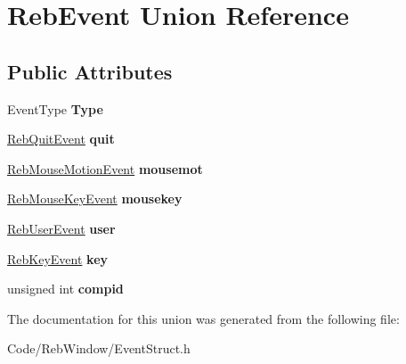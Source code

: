 \hypertarget{union_reb_event}{}\section{Reb\+Event Union Reference}
\label{union_reb_event}
\subsection*{Public Attributes}
\begin{DoxyCompactItemize}
\item 
Event\+Type {\bfseries Type}\hypertarget{union_reb_event_a24ad77f260f8932a452888a1b56dd7bc}{}\label{union_reb_event_a24ad77f260f8932a452888a1b56dd7bc}

\item 
\hyperlink{struct_reb_quit_event}{Reb\+Quit\+Event} {\bfseries quit}\hypertarget{union_reb_event_aa0204985fc02b6993be96a66fcda4310}{}\label{union_reb_event_aa0204985fc02b6993be96a66fcda4310}

\item 
\hyperlink{struct_reb_mouse_motion_event}{Reb\+Mouse\+Motion\+Event} {\bfseries mousemot}\hypertarget{union_reb_event_a8555acd147ae2690ad1ac3d5662d073d}{}\label{union_reb_event_a8555acd147ae2690ad1ac3d5662d073d}

\item 
\hyperlink{struct_reb_mouse_key_event}{Reb\+Mouse\+Key\+Event} {\bfseries mousekey}\hypertarget{union_reb_event_a7999eaa3e4f3f73c4ca3d0933426f2dd}{}\label{union_reb_event_a7999eaa3e4f3f73c4ca3d0933426f2dd}

\item 
\hyperlink{struct_reb_user_event}{Reb\+User\+Event} {\bfseries user}\hypertarget{union_reb_event_a1c5d61209fd44b0b4432a741ecba4934}{}\label{union_reb_event_a1c5d61209fd44b0b4432a741ecba4934}

\item 
\hyperlink{class_reb_key_event}{Reb\+Key\+Event} {\bfseries key}\hypertarget{union_reb_event_a6cb945d219768cc8bf4f154e5ec8264b}{}\label{union_reb_event_a6cb945d219768cc8bf4f154e5ec8264b}

\item 
unsigned int {\bfseries compid}\hypertarget{union_reb_event_a01ca4d8c3ebebd777a7c49a221a8dd4b}{}\label{union_reb_event_a01ca4d8c3ebebd777a7c49a221a8dd4b}

\end{DoxyCompactItemize}


The documentation for this union was generated from the following file\+:\begin{DoxyCompactItemize}
\item 
Code/\+Reb\+Window/Event\+Struct.\+h\end{DoxyCompactItemize}
